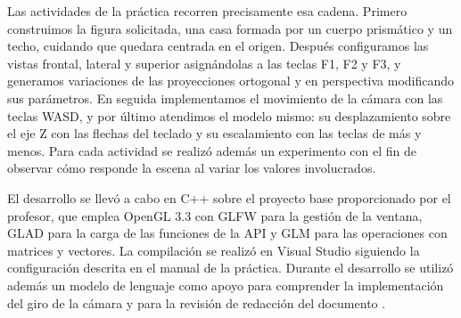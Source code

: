 Las actividades de la práctica recorren precisamente esa cadena. Primero construimos la figura solicitada, una casa formada por un cuerpo prismático y un techo, cuidando que quedara centrada en el origen. Después configuramos las vistas frontal, lateral y superior asignándolas a las teclas F1, F2 y F3, y generamos variaciones de las proyecciones ortogonal y en perspectiva modificando sus parámetros. En seguida implementamos el movimiento de la cámara con las teclas WASD, y por último atendimos el modelo mismo: su desplazamiento sobre el eje Z con las flechas del teclado y su escalamiento con las teclas de más y menos. Para cada actividad se realizó además un experimento con el fin de observar cómo responde la escena al variar los valores involucrados.

El desarrollo se llevó a cabo en C++ sobre el proyecto base proporcionado por el profesor, que emplea OpenGL 3.3 con GLFW para la gestión de la ventana, GLAD para la carga de las funciones de la API y GLM para las operaciones con matrices y vectores. La compilación se realizó en Visual Studio siguiendo la configuración descrita en el manual de la práctica. Durante el desarrollo se utilizó además un modelo de lenguaje como apoyo para comprender la implementación del giro de la cámara y para la revisión de redacción del documento \cite{anthropic2026}.